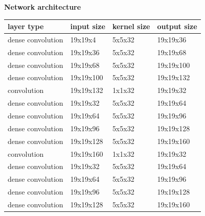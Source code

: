 \documentclass[xcolor=dvipsnames]{beamer}
\begin{document}
\begin{frame}{\bf Network architecture}

\scriptsize
{
\begin{table}[]
\begin{tabular}{|l|l|l|l|}
\hline
\textbf{layer type}                       & \textbf{input size} & \textbf{kernel size} & \textbf{output size} \\ \hline
\cellcolor[HTML]{FD6864}dense convolution & 19x19x4             & 5x5x32               & 19x19x36             \\ \hline
\cellcolor[HTML]{FD6864}dense convolution & 19x19x36            & 5x5x32               & 19x19x68             \\ \hline
\cellcolor[HTML]{FD6864}dense convolution & 19x19x68            & 5x5x32               & 19x19x100            \\ \hline
\cellcolor[HTML]{FD6864}dense convolution & 19x19x100           & 5x5x32               & 19x19x132            \\ \hline
\cellcolor[HTML]{34CDF9}convolution       & 19x19x132           & 1x1x32               & 19x19x32             \\ \hline
\cellcolor[HTML]{FD6864}dense convolution & 19x19x32            & 5x5x32               & 19x19x64             \\ \hline
\cellcolor[HTML]{FD6864}dense convolution & 19x19x64            & 5x5x32               & 19x19x96             \\ \hline
\cellcolor[HTML]{FD6864}dense convolution & 19x19x96            & 5x5x32               & 19x19x128            \\ \hline
\cellcolor[HTML]{FD6864}dense convolution & 19x19x128           & 5x5x32               & 19x19x160            \\ \hline
\cellcolor[HTML]{34CDF9}convolution       & 19x19x160           & 1x1x32               & 19x19x32             \\ \hline
\cellcolor[HTML]{FD6864}dense convolution & 19x19x32            & 5x5x32               & 19x19x64             \\ \hline
\cellcolor[HTML]{FD6864}dense convolution & 19x19x64            & 5x5x32               & 19x19x96             \\ \hline
\cellcolor[HTML]{FD6864}dense convolution & 19x19x96            & 5x5x32               & 19x19x128            \\ \hline
\cellcolor[HTML]{FD6864}dense convolution & 19x19x128           & 5x5x32               & 19x19x160            \\ \hline

\end{tabular}
\end{table}}
\end{frame}
\end{document}
